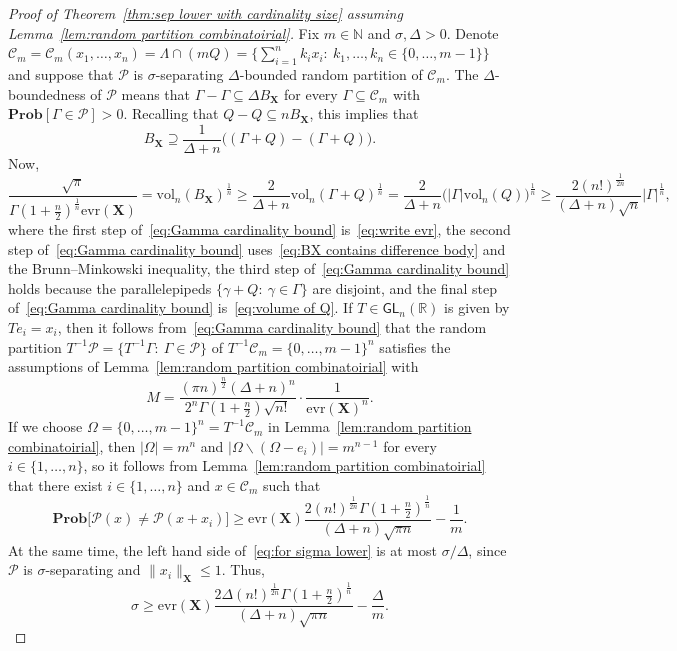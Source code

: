 \documentclass[11pt,reqno]{amsart}
\renewcommand{\le}{\leqslant}
\renewcommand{\ge}{\geqslant}
\renewcommand{\setminus}{\smallsetminus}
\newcommand{\evr}{\mathrm{evr}}
\newcommand{\n}{\{1,\ldots,n\}}
\newcommand{\X}{\mathbf X}
\newcommand{\R}{\mathbb R}
\theoremstyle{remark}
\newcommand{\GL}{\mathsf{GL}}
\renewcommand{\subset}{\subseteq}
\newcommand{\N}{\mathbb N}
\renewcommand{\Pr}{\mathbf{Prob}}
\newcommand{\sub}{\mathscr{C}}
\newcommand{\vol}{\mathrm{vol}}
\renewcommand{\1}{\mathbf 1}
\newcommand{\Part}{\mathscr{P}}
\begin{document}
\begin{proof}[Proof of Theorem~\ref{thm:sep lower with cardinality size} assuming Lemma~\ref{lem:random partition combinatoirial}]
Fix $m\in \N$ and $\sigma,\Delta>0$. Denote $\sub_m=\sub_m(x_1,\ldots,x_n)=\Lambda\cap (mQ)=\{\sum_{i=1}^n k_i x_i:\ k_1,\ldots,k_n\in \{0,\ldots,m-1\}\}$ and suppose that $\Part$ is $\sigma$-separating $\Delta$-bounded random partition of $\sub_m$. The $\Delta$-boundedness of $\Part$ means that $\Gamma-\Gamma\subset \Delta B_\X$ for every $\Gamma\subset \sub_m$ with $\Pr[\Gamma\in \Part]>0$. Recalling that $Q-Q\subset nB_\X$, this implies that
\begin{equation}\label{eq:BX contains difference body}
B_\X\supseteq \frac{1}{\Delta+n}\big( (\Gamma+Q)-(\Gamma+Q)\big).
\end{equation}
Now,
\begin{equation}\label{eq:Gamma cardinality bound}
\frac{\sqrt{\pi}}{ \Gamma\left(1+\frac{n}{2}\right)^{\frac{1}{n}}\evr(\X)} =\vol_n(B_\X)^{\frac{1}{n}}\ge \frac{2}{\Delta+n}\vol_n(\Gamma+Q)^{\frac{1}{n}}=\frac{2}{\Delta+n}\big(|\Gamma|\vol_n(Q)\big)^{\frac{1}{n}}\ge \frac{2(n!)^{\frac{1}{2n}}}{(\Delta+n)\sqrt{n}}|\Gamma|^{\frac{1}{n}},
\end{equation}
where the first step of~\eqref{eq:Gamma cardinality bound} is~\eqref{eq:write evr}, the second step of~\eqref{eq:Gamma cardinality bound} uses~\eqref{eq:BX contains difference body} and the Brunn--Minkowski inequality, the third step of~\eqref{eq:Gamma cardinality bound} holds because the parallelepipeds $\{\gamma+Q:\ \gamma\in \Gamma\}$ are disjoint, and the final step of~\eqref{eq:Gamma cardinality bound} is~\eqref{eq:volume of Q}. If $T\in \GL_n(\R)$ is given by $Te_i=x_i$, then it follows from~\eqref{eq:Gamma cardinality bound} that the random partition $T^{-1}\Part=\{T^{-1}\Gamma:\ \Gamma\in \Part\}$ of $T^{-1}\sub_m=\{0,\ldots,m-1\}^n$ satisfies the assumptions of Lemma~\ref{lem:random partition combinatoirial} with
$$
M=\frac{(\pi n)^{\frac{n}{2}}(\Delta+n)^n}{2^n\Gamma\left(1+\frac{n}{2}\right)\sqrt{n!}}\cdot\frac{1}{\evr(\X)^n}.
$$
If we choose $\Omega=\{0,\ldots,m-1\}^n=T^{-1}\sub_m$ in Lemma~\ref{lem:random partition combinatoirial}, then  $|\Omega|=m^n$ and $|\Omega\setminus (\Omega-e_i)|=m^{n-1}$ for every $i\in \n$, so it follows from Lemma~\ref{lem:random partition combinatoirial} that there exist $i\in \n$ and $x\in \sub_m$ such that
\begin{equation}\label{eq:for sigma lower}
\Pr \big[\Part(x)\neq \Part(x+x_i)\big]\ge \evr(\X)\frac{2(n!)^{\frac{1}{2n}}\Gamma\left(1+\frac{n}{2}\right)^{\frac{1}{n}}}{(\Delta+n)\sqrt{\pi n}} -\frac{1}{m}.
\end{equation}
At the same time, the left hand side of~\eqref{eq:for sigma lower} is at most $\sigma/\Delta$,  since $\Part$ is $\sigma$-separating and $\|x_i\|_\X\le 1$. Thus,
\begin{equation}\label{eq:before m limit}
\sigma\ge \evr(\X)\frac{2\Delta(n!)^{\frac{1}{2n}}\Gamma\left(1+\frac{n}{2}\right)^{\frac{1}{n}}}{(\Delta+n)\sqrt{\pi n}} -\frac{\Delta}{m}.
\end{equation}


\end{proof}
\end{document}
